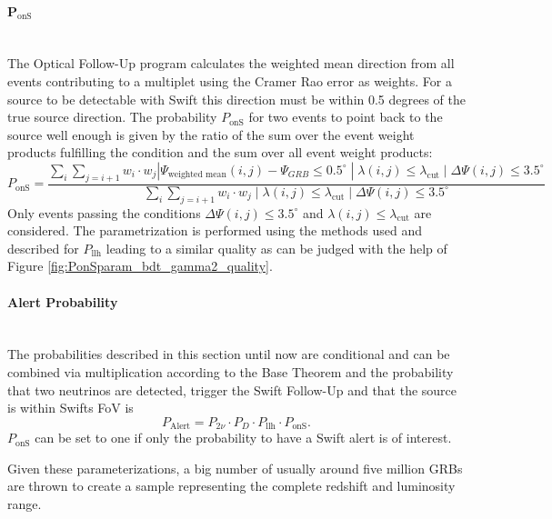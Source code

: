 \paragraph{P$_\text{onS}$}$\;$\\
The Optical Follow-Up program calculates the weighted mean direction from all
events contributing to a multiplet using the Cramer Rao error as weights. For a 
source to be detectable
with Swift this
direction must be within 0.5 degrees of the true source direction. The
probability $P_\text{onS}$ for two events to point back to the source well
enough is given by
the ratio of the sum over the event weight products fulfilling the condition
and the sum over all event weight products:
\begin{equation}
P_\text{onS} = \frac{\sum_i \sum_{j=i+1} w_i \cdot w_j |
\Psi_{\text{weighted mean}}(i, j) - \Psi_{GRB} \leq 0.5^{\circ} \; | \;
\lambda(i, j)
\leq \lambda_\text{cut} \; | \; \Delta \Psi(i, j) \leq 3.5^{\circ}}{\sum_i
\sum_{j=i+1} w_i \cdot w_j \; | \; \lambda(i, j)
\leq \lambda_\text{cut} \; | \; \Delta \Psi(i, j) \leq 3.5^{\circ}} 
\end{equation}
Only events passing the conditions $\Delta \Psi(i,j) \leq 3.5^\circ$ and 
$\lambda(i, j) \leq \lambda_\text{cut}$ are considered.
The parametrization is performed using the methods used and described for 
$P_\text{llh}$ leading to a similar quality as can be judged with the help of 
Figure 
\ref{fig:PonSparam_bdt_gamma2_quality}.

\paragraph{Alert Probability}$\;$\\
The probabilities described in this section until now are conditional and can 
be 
combined via multiplication according to the Base Theorem and the probability 
that two neutrinos are detected, trigger the Swift Follow-Up and that the 
source is within Swifts FoV is
\begin{equation}
 P_\text{Alert} = P_{2\nu} \cdot P_D \cdot P_\text{llh} \cdot P_\text{onS}.
\end{equation}
$P_\text{onS}$ can be set to one if only the probability to have a Swift
alert is of interest.

Given these parameterizations, a big number of usually around five 
million GRBs are thrown to create a sample representing the complete redshift 
and luminosity range.



